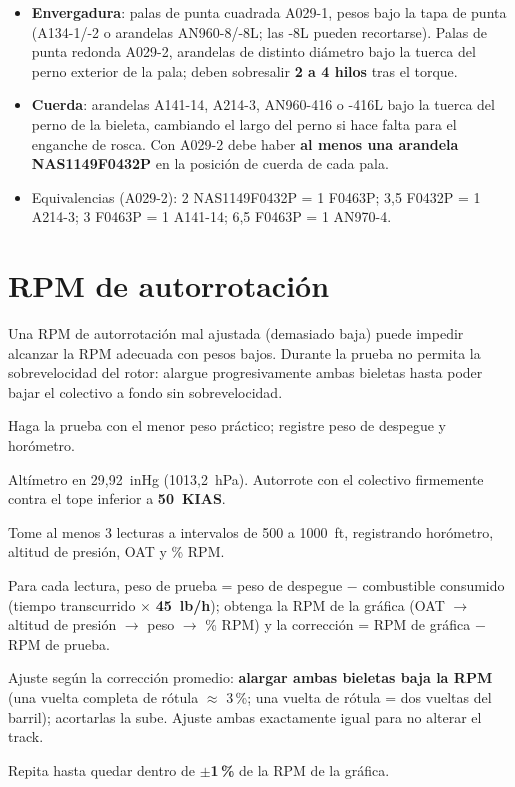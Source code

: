 \begin{itemize}
\item \textbf{Envergadura}: palas de punta cuadrada A029-1, pesos bajo la tapa de punta (A134-1/-2 o arandelas AN960-8/-8L; las -8L pueden recortarse). Palas de punta redonda A029-2, arandelas de distinto diámetro bajo la tuerca del perno exterior de la pala; deben sobresalir \textbf{2 a 4 hilos} tras el torque.
\item \textbf{Cuerda}: arandelas A141-14, A214-3, AN960-416 o -416L bajo la tuerca del perno de la bieleta, cambiando el largo del perno si hace falta para el enganche de rosca. Con A029-2 debe haber \textbf{al menos una arandela NAS1149F0432P} en la posición de cuerda de cada pala.
\item Equivalencias (A029-2): 2 NAS1149F0432P = 1 F0463P; 3,5 F0432P = 1 A214-3; 3 F0463P = 1 A141-14; 6,5 F0463P = 1 AN970-4.
\end{itemize}

\section{RPM de autorrotación}

\begin{advertencia}
Una RPM de autorrotación mal ajustada (demasiado baja) puede impedir alcanzar la RPM adecuada con pesos bajos. Durante la prueba no permita la sobrevelocidad del rotor: alargue progresivamente ambas bieletas hasta poder bajar el colectivo a fondo sin sobrevelocidad.
\end{advertencia}

\begin{pasos}
\item Haga la prueba con el menor peso práctico; registre peso de despegue y horómetro.
\item Altímetro en 29,92~inHg (1013,2~hPa). Autorrote con el colectivo firmemente contra el tope inferior a \textbf{50~KIAS}.
\item Tome al menos 3 lecturas a intervalos de 500 a 1000~ft, registrando horómetro, altitud de presión, OAT y \% RPM.
\item Para cada lectura, peso de prueba = peso de despegue $-$ combustible consumido (tiempo transcurrido $\times$ \textbf{45~lb/h}); obtenga la RPM de la gráfica (OAT $\rightarrow$ altitud de presión $\rightarrow$ peso $\rightarrow$ \% RPM) y la corrección = RPM de gráfica $-$ RPM de prueba.
\item Ajuste según la corrección promedio: \textbf{alargar ambas bieletas baja la RPM} (una vuelta completa de rótula $\approx$ 3\,\%; una vuelta de rótula = dos vueltas del barril); acortarlas la sube. Ajuste ambas exactamente igual para no alterar el track.
\item Repita hasta quedar dentro de \textbf{$\pm$1\,\%} de la RPM de la gráfica.
\end{pasos}

